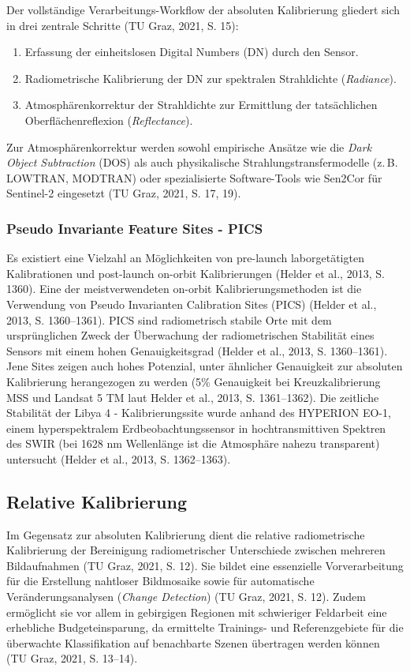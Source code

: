 \documentclass[11pt]{report}
\begin{document}
Der vollständige Verarbeitungs-Workflow der absoluten Kalibrierung gliedert sich in drei zentrale Schritte (TU Graz, 2021, S. 15):
\begin{enumerate}
    \item Erfassung der einheitslosen Digital Numbers (DN) durch den Sensor.
    \item Radiometrische Kalibrierung der DN zur spektralen Strahldichte (\textit{Radiance}).
    \item Atmosphärenkorrektur der Strahldichte zur Ermittlung der tatsächlichen Oberflächenreflexion (\textit{Reflectance}).
\end{enumerate}

Zur Atmosphärenkorrektur werden sowohl empirische Ansätze wie die \textit{Dark Object Subtraction} (DOS) als auch physikalische Strahlungstransfermodelle (z.\,B. LOWTRAN, MODTRAN) oder spezialisierte Software-Tools wie Sen2Cor für Sentinel-2 eingesetzt (TU Graz, 2021, S. 17, 19).

\subsubsection{Pseudo Invariante Feature Sites - PICS}
Es existiert eine Vielzahl an Möglichkeiten von pre-launch laborgetätigten Kalibrationen und post-launch on-orbit Kalibrierungen (Helder et al., 2013, S. 1360). Eine der meistverwendeten on-orbit Kalibrierungsmethoden ist die Verwendung von Pseudo Invarianten Calibration Sites (PICS) (Helder et al., 2013, S. 1360–1361). PICS sind radiometrisch stabile Orte mit dem ursprünglichen Zweck der Überwachung der radiometrischen Stabilität eines Sensors mit einem hohen Genauigkeitsgrad (Helder et al., 2013, S. 1360–1361). Jene Sites zeigen auch hohes Potenzial, unter ähnlicher Genauigkeit zur absoluten Kalibrierung herangezogen zu werden (5\% Genauigkeit bei Kreuzkalibrierung MSS und Landsat 5 TM laut Helder et al., 2013, S. 1361–1362). Die zeitliche Stabilität der Libya 4 - Kalibrierungssite wurde anhand des HYPERION EO-1, einem hyperspektralem Erdbeobachtungssensor in hochtransmittiven Spektren des SWIR (bei 1628 nm Wellenlänge ist die Atmosphäre nahezu transparent) untersucht (Helder et al., 2013, S. 1362–1363).

\subsection{Relative Kalibrierung}
Im Gegensatz zur absoluten Kalibrierung dient die relative radiometrische Kalibrierung der Bereinigung radiometrischer Unterschiede zwischen mehreren Bildaufnahmen (TU Graz, 2021, S. 12). Sie bildet eine essenzielle Vorverarbeitung für die Erstellung nahtloser Bildmosaike sowie für automatische Veränderungsanalysen (\textit{Change Detection}) (TU Graz, 2021, S. 12). Zudem ermöglicht sie vor allem in gebirgigen Regionen mit schwieriger Feldarbeit eine erhebliche Budgeteinsparung, da ermittelte Trainings- und Referenzgebiete für die überwachte Klassifikation auf benachbarte Szenen übertragen werden können (TU Graz, 2021, S. 13–14).
\end{document}
